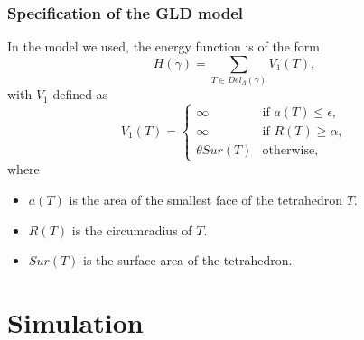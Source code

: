 \documentclass[c, 10pt]{beamer}
\begin{document}
\begin{frame}\frametitle{Specification of the GLD model}
In the model we used, the energy function is of the form
$$H(\gamma)= \sum_{T \in Del_\Lambda(\gamma)} V_1(T),$$ 
with $V_1$ defined as
\begin{equation}\label{model}
V_1(T) = 
\left\{
    \begin{array}{ll}
        \infty & \mbox{if } a(T)\leq \epsilon, \\
        \infty & \mbox{if } R(T)\geq \alpha, \\
        \theta Sur(T) & \mbox{otherwise, }
    \end{array}
\right. 
\end{equation}
where
\begin{itemize}
\item $a(T)$ is the area of the smallest face of the tetrahedron $T$.
\item $R(T)$ is the circumradius of $T$.
\item $Sur(T)$ is the surface area of the tetrahedron.
\end{itemize}

\end{frame}


\section{Simulation}
\framesection{}
\end{document}
